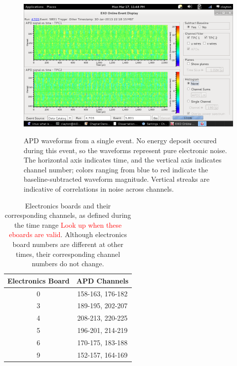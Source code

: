 \begin{figure}
\begin{center}
\includegraphics[keepaspectratio=true,width=\textwidth,clip=true,trim=1mm 21mm 91mm 24mm]{Run4705Ev5801_noiseEventDisplay.png}
\end{center}
\renewcommand{\baselinestretch}{1}
\small\normalsize
\begin{quote}
\caption{APD waveforms from a single event.  No energy deposit occured during this event, so the waveforms represent pure electronic noise.  The horizontal axis indicates time, and the vertical axis indicates channel number; colors ranging from blue to red indicate the baseline-subtracted waveform magnitude.  Vertical streaks are indicative of correlations in noise across channels.}
\label{fig:EvtDisplay_APDNoise}
\end{quote}
\end{figure}
\renewcommand{\baselinestretch}{2}
\small\normalsize

\begin{table}
\begin{center}
\begin{tabular}{|c|c|}
\hline Electronics Board & APD Channels \\ \hline
0 & 158-163, 176-182 \\
3 & 189-195, 202-207 \\
4 & 208-213, 220-225 \\
5 & 196-201, 214-219 \\
6 & 170-175, 183-188 \\
9 & 152-157, 164-169 \\ \hline
\end{tabular}
\end{center}
\caption{Electronics boards and their corresponding channels, as defined during the time range \textcolor{red}{Look up when these eboards are valid}.  Although electronics board numbers are different at other times, their corresponding channel numbers do not change.}
\label{tab:EBoardChannelNumbers}
\end{table}

